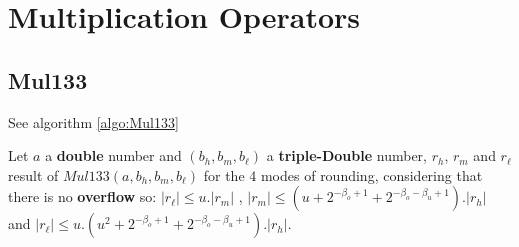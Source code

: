 \section{Multiplication Operators}
\subsection{Mul133}
See algorithm \ref{algo:Mul133} 

\begin{lem}[Mul133] Let $a$ a \textbf{double} number and $(b_h, b_m, b_{\ell})$ a   \textbf{triple-Double} number, $r_h$, $r_m$ and  $r_{\ell}$ result of $Mul133(a,b_h,b_m,b_{\ell})$ for the $4$ modes of rounding, considering that there is no \textbf{overflow} so: $ \lvert r_{\ell} \rvert \le u. \lvert r_m \rvert$ , $\lvert r_m \rvert \le (u + 2^{-\beta_o+1} + 2^{-\beta_o -\beta_u+1}).\lvert r_h \rvert$ and $\lvert r_{\ell} \rvert \le u.(u^2 + 2^{-\beta_o+1} + 2^{-\beta_o -\beta_u+1}).\lvert r_h \rvert$.
\end{lem}


